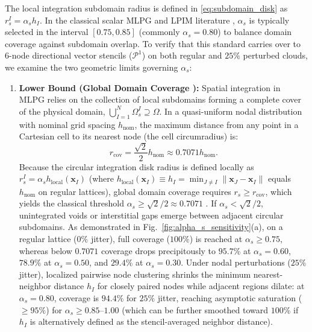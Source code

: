 \documentclass[preprint,12pt]{elsarticle}
\begin{document}
The local integration subdomain radius is defined in \eqref{eq:subdomain_disk} as $r_s^I = \alpha_s h_I$. In the classical scalar MLPG and LPIM literature \cite{atluri2002meshless, liu2009mesh}, $\alpha_s$ is typically selected in the interval $[0.75, 0.85]$ (commonly $\alpha_s = 0.80$) to balance domain coverage against subdomain overlap. To verify that this standard carries over to 6-node directional vector stencils ($\mathcal{P}^1$) on both regular and $25\%$ perturbed clouds, we examine the two geometric limits governing $\alpha_s$:
\begin{enumerate}
    \item \textbf{Lower Bound (Global Domain Coverage \cite{atluri2002meshless, liu2009mesh}):} Spatial integration in MLPG relies on the collection of local subdomains forming a complete cover of the physical domain, $\bigcup_{I=1}^N \Omega_s^I \supseteq \Omega$. In a quasi-uniform nodal distribution with nominal grid spacing $h_{\mathrm{nom}}$, the maximum distance from any point in a Cartesian cell to its nearest node (the cell circumradius) is:
          \begin{equation}
              r_{\mathrm{cov}} = \frac{\sqrt{2}}{2} h_{\mathrm{nom}} \approx 0.7071 h_{\mathrm{nom}}.
              \label{eq:alpha_s_lower_bound}
          \end{equation}
          Because the circular integration disk radius is defined locally as $r_s^I = \alpha_s h_{\mathrm{local}}(\mathbf{x}_I)$ (where $h_{\mathrm{local}}(\mathbf{x}_I) \equiv h_I = \min_{J \ne I} \|\mathbf{x}_J - \mathbf{x}_I\|$ equals $h_{\mathrm{nom}}$ on regular lattices), global domain coverage requires $r_s \ge r_{\mathrm{cov}}$, which yields the classical threshold $\alpha_s \ge \sqrt{2}/2 \approx 0.7071$ \cite{atluri2002meshless, liu2009mesh}. If $\alpha_s < \sqrt{2}/2$, unintegrated voids or interstitial gaps emerge between adjacent circular subdomains. As demonstrated in Fig.~\ref{fig:alpha_s_sensitivity}(a), on a regular lattice ($0\%$ jitter), full coverage ($100\%$) is reached at $\alpha_s \ge 0.75$, whereas below $0.7071$ coverage drops precipitously to $95.7\%$ at $\alpha_s = 0.60$, $78.9\%$ at $\alpha_s = 0.50$, and $29.4\%$ at $\alpha_s = 0.30$. Under nodal perturbations ($25\%$ jitter), localized pairwise node clustering shrinks the minimum nearest-neighbor distance $h_I$ for closely paired nodes while adjacent regions dilate: at $\alpha_s = 0.80$, coverage is $94.4\%$ for $25\%$ jitter, reaching asymptotic saturation ($\ge 95\%$) for $\alpha_s \ge 0.85\text{--}1.00$ (which can be further smoothed toward $100\%$ if $h_I$ is alternatively defined as the stencil-averaged neighbor distance).

\end{enumerate}
\end{document}
